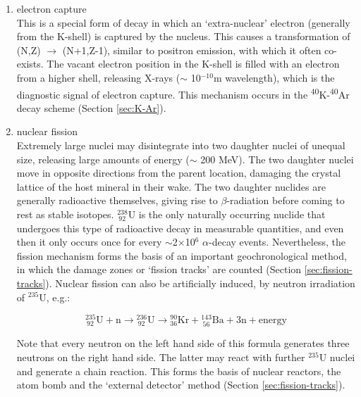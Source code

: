 \begin{enumerate}
\item{electron capture}\\ This is a special form of decay in which an
  `extra-nuclear' electron (generally from the K-shell) is captured by
  the nucleus. This causes a transformation of (N,Z) $\rightarrow$
  (N+1,Z-1), similar to positron emission, with which it often
  co-exists. The vacant electron position in the K-shell is filled with
  an electron from a higher shell, releasing X-rays ($\sim$
  10$^{-10}$m wavelength), which is the diagnostic signal of electron
  capture. This mechanism occurs in the
  \textsuperscript{40}K-\textsuperscript{40}Ar decay scheme (Section
  \ref{sec:K-Ar}).

\item{nuclear fission}\\ Extremely large nuclei may disintegrate into
  two daughter nuclei of unequal size, releasing large amounts of
  energy ($\sim$ 200 MeV). The two daughter nuclei move in opposite
  directions from the parent location, damaging the crystal lattice of
  the host mineral in their wake. The two daughter nuclides are
  generally radioactive themselves, giving rise to $\beta$-radiation
  before coming to rest as stable isotopes.  $^{238}_{~92}$U is the
  only naturally occurring nuclide that undergoes this type of
  radioactive decay in measurable quantities, and even then it only
  occurs once for every $\sim$2$\times$10$^6$ $\alpha$-decay events.
  Nevertheless, the fission mechanism forms the basis of an important
  geochronological method, in which the damage zones or `fission
  tracks' are counted (Section \ref{sec:fission-tracks}). Nuclear
  fission can also be artificially induced, by neutron irradiation of
  $^{235}$U, e.g.:

\begin{equation}
{}^{235}_{~92}\mathrm{U} + \mathrm{n} \rightarrow
{}^{236}_{~92}\mathrm{U} \rightarrow {}^{90}_{36}\mathrm{Kr} +
{}^{143}_{~56}\mathrm{Ba} + 3\mathrm{n} + \mbox{energy}
\label{eq:235Ufission}
\end{equation}

Note that every neutron on the left hand side of this formula
generates three neutrons on the right hand side. The latter may react
with further $^{235}$U nuclei and generate a chain reaction. This
forms the basis of nuclear reactors, the atom bomb and the `external
detector' method (Section \ref{sec:fission-tracks}).

\end{enumerate}

